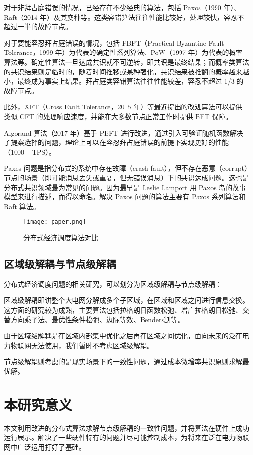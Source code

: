 对于非拜占庭错误的情况，已经存在不少经典的算法，包括 Paxos（1990 年）、Raft（2014 年）及其变种等。这类容错算法往往性能比较好，处理较快，容忍不超过一半的故障节点。

对于要能容忍拜占庭错误的情况，包括 PBFT（Practical Byzantine Fault Tolerance，1999 年）为代表的确定性系列算法、PoW（1997 年）为代表的概率算法等。确定性算法一旦达成共识就不可逆转，即共识是最终结果；而概率类算法的共识结果则是临时的，随着时间推移或某种强化，共识结果被推翻的概率越来越小，最终成为事实上结果。拜占庭类容错算法往往性能较差，容忍不超过 1/3 的故障节点。

此外，XFT（Cross Fault Tolerance，2015 年）等最近提出的改进算法可以提供类似 CFT 的处理响应速度，并能在大多数节点正常工作时提供 BFT 保障。

Algorand 算法（2017 年）基于 PBFT 进行改进，通过引入可验证随机函数解决了提案选择的问题，理论上可以在容忍拜占庭错误的前提下实现更好的性能（1000+ TPS）。

Paxos 问题是指分布式的系统中存在故障（crash fault），但不存在恶意（corrupt）节点的场景（即可能消息丢失或重复，但无错误消息）下的共识达成问题。这也是分布式共识领域最为常见的问题。因为最早是 Leslie Lamport 用 Paxos 岛的故事模型来进行描述，而得以命名。解决 Paxos 问题的算法主要有 Paxos 系列算法和 Raft 算法。

\begin{figure}[htbp] %
    \centering
    \texttt{[image: paper.png]}
    \caption{分布式经济调度算法对比}
    \label{fig:Directed-graph}
\end{figure}

\subsection{区域级解耦与节点级解耦}

分布式经济调度问题的相关研究，可以划分为区域级解耦与节点级解耦：

区域级解耦即讲整个大电网分解成多个子区域，在区域和区域之间进行信息交换。这方面的研究较为成熟，主要算法包括拉格朗日函数松弛、增广拉格朗日松弛、交替方向乘子法、最优性条件松弛、边际等效、Benders割等。

由于区域级解耦是在区域内部集中优化之后再在区域之间优化，面向未来的泛在电力物联网无法使用，我们暂时不考虑区域级解耦。

节点级解耦则考虑的是现实场景下的一致性问题，通过成本微增率共识原则求解最优解。

\section{本研究意义}

本文利用改进的分布式算法求解节点级解耦的一致性问题，并将算法在硬件上成功运行展示。解决了一些硬件特有的问题并尽可能控制成本，为将来在泛在电力物联网中广泛运用打好了基础。